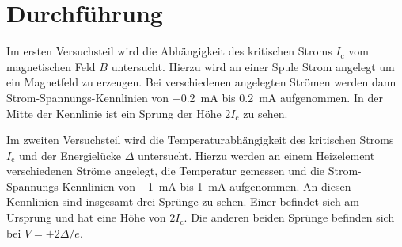 \section{Durchführung}
Im ersten Versuchsteil wird die Abhängigkeit des kritischen Stroms $I_\mathrm{c}$ vom magnetischen Feld $B$ untersucht. Hierzu wird an einer Spule Strom angelegt um ein Magnetfeld zu erzeugen. Bei verschiedenen angelegten Strömen werden dann Strom-Spannungs-Kennlinien von \SI{-0.2}{\milli\ampere} bis \SI{0.2}{\milli\ampere} aufgenommen. In der Mitte der Kennlinie ist ein Sprung der Höhe $2 I_\mathrm{c}$ zu sehen.

Im zweiten Versuchsteil wird die Temperaturabhängigkeit des kritischen Stroms $I_\mathrm{c}$ und der Energielücke $\Delta$ untersucht. Hierzu werden an einem Heizelement verschiedenen Ströme angelegt, die Temperatur gemessen und die Strom-Spannungs-Kennlinien von \SI{-1}{\milli\ampere} bis \SI{1}{\milli\ampere} aufgenommen. An diesen Kennlinien sind insgesamt drei Sprünge zu sehen. Einer befindet sich am Ursprung und hat eine Höhe von $2 I_\mathrm{c}$. Die anderen beiden Sprünge befinden sich bei $V = \pm 2\Delta/e$.

